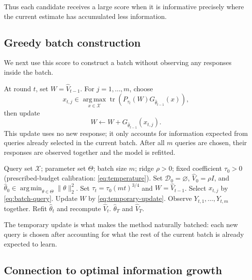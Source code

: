 \documentclass[10pt,twoside,letterpaper]{article}
\newcommand{\tr}{\operatorname{tr}}
\newcommand{\argmin}{\operatorname*{arg\,min}}
\newcommand{\argmax}{\operatorname*{arg\,max}}
\newcommand{\norm}[1]{\lVert #1\rVert}
\newcommand{\FB}{\textnormal{\textsc{FisherBalancing}}}
\newcommand{\thetahat}{\widehat\theta}
\newcommand{\Vhat}{\widehat V}
\begin{document}
Thus each candidate receives a large score when it is informative
precisely where the current estimate has accumulated less information.


\subsection{Greedy batch construction}

We next use this score to construct a batch without observing any
responses inside the batch.

At round $t$, set $W=\Vhat_{t-1}$. For $j=1,\ldots,m$, choose
\begin{equation}
x_{t,j}
\in
\argmax_{x\in\mathcal X}
\tr\!\left(
P_{\tau_t}(W)
G_{\thetahat_{t-1}}(x)
\right),
\label{eq:batch-query}
\end{equation}
then update
\begin{equation}
W
\leftarrow
W+
G_{\thetahat_{t-1}}(x_{t,j}).
\label{eq:temporary-update}
\end{equation}
This update uses no new response; it only accounts for information
expected from queries already selected in the current batch. After all
$m$ queries are chosen, their responses are observed together and the
model is refitted.

\begin{algorithm}[t]
\caption{\FB{} with batch size $m$}
\label{alg:fb}
\begin{algorithmic}[1]
\REQUIRE Query set $\mathcal X$; parameter set $\Theta$; batch size $m$;
ridge $\rho>0$; fixed coefficient $\tau_0>0$
(prescribed-budget calibration: \eqref{eq:temperature}).
\STATE Set $\mathcal D_0=\varnothing$, $\Vhat_0=\rho I$, and
$\thetahat_0\in\argmin_{\theta\in\Theta}\norm{\theta}_2^2$.
  \STATE Set $\tau_t=\tau_0(mt)^{3/4}$ and $W=\Vhat_{t-1}$.
    \STATE Select $x_{t,j}$ by \eqref{eq:batch-query}.
    \STATE Update $W$ by \eqref{eq:temporary-update}.
  \ENDFOR
  \STATE Observe $Y_{t,1},\ldots,Y_{t,m}$ together.
  \STATE Refit $\thetahat_t$ and recompute $\Vhat_t$.
\ENDFOR
\RETURN $\thetahat_T$ and $\Vhat_T$.
\end{algorithmic}
\end{algorithm}

The temporary update is what makes the method naturally batched: each
new query is chosen after accounting for what the rest of the current
batch is already expected to learn.


\subsection{Connection to optimal information growth}
\end{document}
